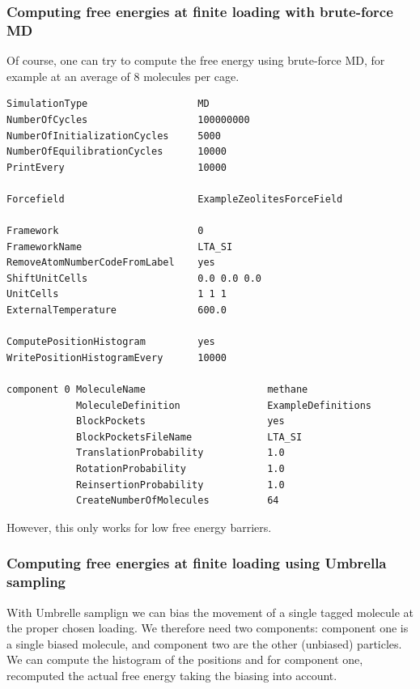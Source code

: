 \subsubsection{Computing free energies at finite loading with brute-force MD}

Of course, one can try to compute the free energy using brute-force MD, for example at an average of 8 molecules per cage.
\begin{tiny}
\begin{verbatim}
SimulationType                   MD
NumberOfCycles                   100000000
NumberOfInitializationCycles     5000
NumberOfEquilibrationCycles      10000
PrintEvery                       10000

Forcefield                       ExampleZeolitesForceField

Framework                        0
FrameworkName                    LTA_SI
RemoveAtomNumberCodeFromLabel    yes
ShiftUnitCells                   0.0 0.0 0.0
UnitCells                        1 1 1
ExternalTemperature              600.0

ComputePositionHistogram         yes
WritePositionHistogramEvery      10000

component 0 MoleculeName                     methane
            MoleculeDefinition               ExampleDefinitions
            BlockPockets                     yes
            BlockPocketsFileName             LTA_SI
            TranslationProbability           1.0
            RotationProbability              1.0
            ReinsertionProbability           1.0
            CreateNumberOfMolecules          64
\end{verbatim}
\end{tiny}

However, this only works for low free energy barriers.

\subsubsection{Computing free energies at finite loading using Umbrella sampling}

With Umbrelle samplign we can bias the movement of a single tagged molecule at the proper chosen loading.
We therefore need two components: component one is a single biased molecule, and component two are the
other (unbiased) particles.
We can compute the histogram of the positions and for component one, recomputed the actual free energy
taking the biasing into account.

